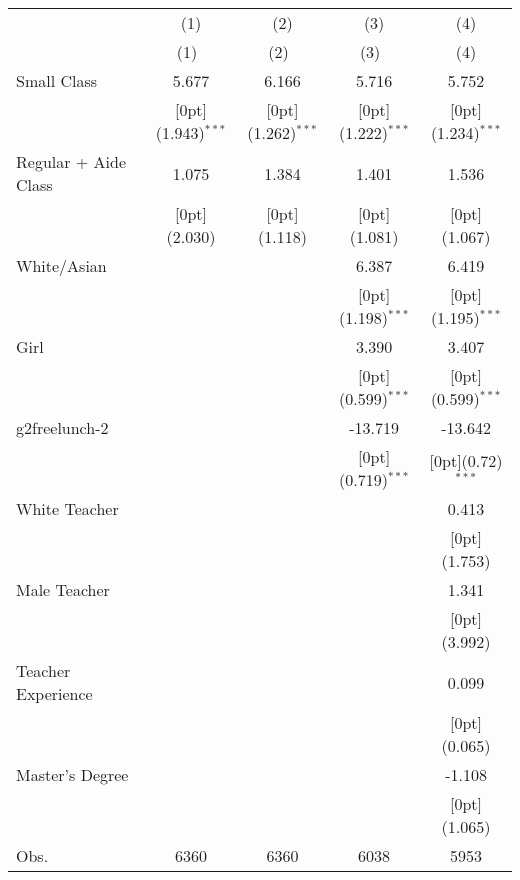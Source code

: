 \begin{tabular*}{\textwidth}{@{\extracolsep{\fill}}lcccc}				
	& \multicolumn{1}{c}{(1)} &	\multicolumn{1}{c}{(2)} &	\multicolumn{1}{c}{(3)} &	\multicolumn{1}{c}{(4)} \\
\cline{2-5}				
	& \multicolumn{1}{c}{(1)\mbox{\ }} &	\multicolumn{1}{c}{(2)\mbox{\ }} &	\multicolumn{1}{c}{(3)\mbox{\ }} &	\multicolumn{1}{c}{(4)} \\
\hline				
Small Class &	5.677 &	6.166 &	5.716 &	5.752 \\
&	\raisebox{.7ex}[0pt]{\scriptsize (1.943)$^{***}$} &	\raisebox{.7ex}[0pt]{\scriptsize (1.262)$^{***}$} &	\raisebox{.7ex}[0pt]{\scriptsize (1.222)$^{***}$} &	\raisebox{.7ex}[0pt]{\scriptsize (1.234)$^{***}$} \\
Regular + Aide Class &	1.075 &	1.384 &	1.401 &	1.536 \\
&	\raisebox{.7ex}[0pt]{\scriptsize (2.030)} &	\raisebox{.7ex}[0pt]{\scriptsize (1.118)} &	\raisebox{.7ex}[0pt]{\scriptsize (1.081)} &	\raisebox{.7ex}[0pt]{\scriptsize (1.067)} \\
White/Asian &	&	&	6.387 &	6.419 \\
&	&	&	\raisebox{.7ex}[0pt]{\scriptsize (1.198)$^{***}$} &	\raisebox{.7ex}[0pt]{\scriptsize (1.195)$^{***}$} \\
Girl &	&	&	3.390 &	3.407 \\
&	&	&	\raisebox{.7ex}[0pt]{\scriptsize (0.599)$^{***}$} &	\raisebox{.7ex}[0pt]{\scriptsize (0.599)$^{***}$} \\
g2freelunch-2 &	&	&	-13.719 &	-13.642 \\
&	&	&	\raisebox{.7ex}[0pt]{\scriptsize (0.719)$^{***}$} &	\raisebox{.7ex}[0pt]{\scriptsize (0.72)$^{***}$} \\
White Teacher &	&	&	&	0.413 \\
&	&	&	&	\raisebox{.7ex}[0pt]{\scriptsize (1.753)} \\
Male Teacher &	&	&	&	1.341 \\
&	&	&	&	\raisebox{.7ex}[0pt]{\scriptsize (3.992)} \\
Teacher Experience &	&	&	&	0.099 \\
&	&	&	&	\raisebox{.7ex}[0pt]{\scriptsize (0.065)} \\
Master's Degree &	&	&	&	-1.108 \\
&	&	&	&	\raisebox{.7ex}[0pt]{\scriptsize (1.065)} \\
Obs. &	6360 &	6360 &	6038 &	5953 \\
\hline\hline				
\end{tabular*}%
